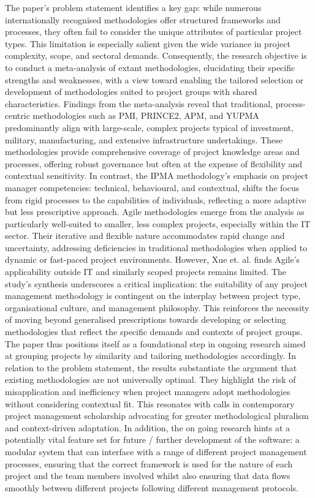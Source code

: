 \documentclass{report}
\begin{document}
The paper’s problem statement identifies a key gap: while numerous internationally recognised methodologies offer structured frameworks and processes, they often fail to consider the unique attributes of particular project types. This limitation is especially salient given the wide variance in project complexity, scope, and sectoral demands. Consequently, the research objective is to conduct a meta-analysis of extant methodologies, elucidating their specific strengths and weaknesses, with a view toward enabling the tailored selection or development of methodologies suited to project groups with shared characteristics.
Findings from the meta-analysis reveal that traditional, process-centric methodologies such as PMI, PRINCE2, APM, and YUPMA predominantly align with large-scale, complex projects typical of investment, military, manufacturing, and extensive infrastructure undertakings. These methodologies provide comprehensive coverage of project knowledge areas and processes, offering robust governance but often at the expense of flexibility and contextual sensitivity. In contrast, the IPMA methodology’s emphasis on project manager competencies: technical, behavioural, and contextual, shifts the focus from rigid processes to the capabilities of individuals, reflecting a more adaptive but less prescriptive approach.
Agile methodologies emerge from the analysis as particularly well-suited to smaller, less complex projects, especially within the IT sector. Their iterative and flexible nature accommodates rapid change and uncertainty, addressing deficiencies in traditional methodologies when applied to dynamic or fast-paced project environments. However, Xue et. al. finds Agile’s applicability outside IT and similarly scoped projects remains limited.
The study’s synthesis underscores a critical implication: the suitability of any project management methodology is contingent on the interplay between project type, organisational culture, and management philosophy. This reinforces the necessity of moving beyond generalised prescriptions towards developing or selecting methodologies that reflect the specific demands and contexts of project groups. The paper thus positions itself as a foundational step in ongoing research aimed at grouping projects by similarity and tailoring methodologies accordingly.
In relation to the problem statement, the results substantiate the argument that existing methodologies are not universally optimal. They highlight the risk of misapplication and inefficiency when project managers adopt methodologies without considering contextual fit. This resonates with calls in contemporary project management scholarship advocating for greater methodological pluralism and context-driven adaptation. In addition, the on going research hints at a potentially vital feature set for future / further development of the software: a modular system that can interface with a range of different project management processes, ensuring that the correct framework is used for the nature of each project and the team members involved whilst also ensuring that data flows smoothly between different projects following different management protocols. 
\end{document}
